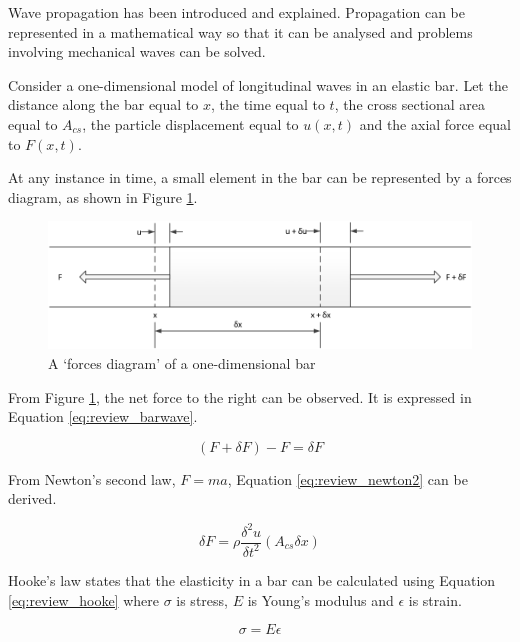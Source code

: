 Wave propagation has been introduced and explained. Propagation can be  represented in a mathematical way so that it can be analysed and problems involving mechanical waves can be solved.

Consider a one-dimensional model of longitudinal waves in an elastic bar. Let the distance along the bar equal to $x$, the time equal to $t$, the cross sectional area equal to $A_{cs}$, the particle displacement equal to $u(x,t)$ and the axial force equal to $F(x,t)$\cite{morse_methods_1953}.

At any instance in time, a small element in the bar can be represented by a forces diagram, as shown in Figure \ref{fig:review_barwave}.

\begin{figure}[ht]
\centering
		\includegraphics[width=\textwidth]{BarWave2.png}
		\caption{A `forces diagram' of a one-dimensional bar}
		\label{fig:review_barwave}
\end{figure}

From Figure \ref{fig:review_barwave}, the net force to the right can be observed. It is expressed in Equation \ref{eq:review_barwave}.

\begin{equation} \label{eq:review_barwave}
(F + \delta F) - F = \delta F
 \end{equation}

From Newton’s second law, $F=ma$, Equation \ref{eq:review_newton2} can be derived.

\begin{equation} \label{eq:review_newton2}
\delta F = \rho \frac{\delta^2 u}{\delta t^2} (A_{cs} \delta x)
 \end{equation}

Hooke's law states that the elasticity in a bar can be calculated using Equation \ref{eq:review_hooke} where $\sigma$ is stress, $E$ is Young's modulus and $\epsilon$ is strain\cite{rychlewski_hookes_1984}. 

\begin{equation} \label{eq:review_hooke}
\sigma = E \epsilon
 \end{equation}

